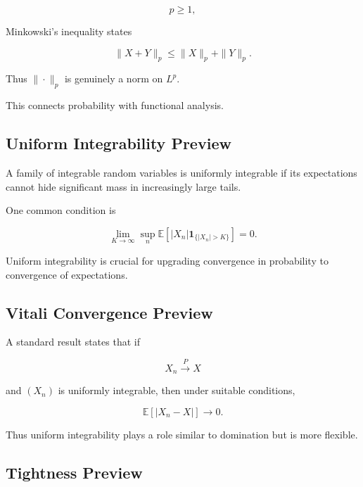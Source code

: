 \[
p\geq1,
\]

Minkowski's inequality states

\[
\boxed{
\|X+Y\|_p
\leq
\|X\|_p+\|Y\|_p.
}
\]

Thus \(\|\cdot\|_p\) is genuinely a norm on \(L^p\).

This connects probability with functional analysis.

\subsection{Uniform Integrability Preview}
\label{subsec:uniform-integrability-preview}

A family of integrable random variables is uniformly integrable if its
expectations cannot hide significant mass in increasingly large tails.

One common condition is

\[
\boxed{
\lim_{K\to\infty}
\sup_n
\mathbb{E}
\left[
|X_n|
\mathbf{1}_{\{|X_n|>K\}}
\right]
=
0.
}
\]

Uniform integrability is crucial for upgrading convergence in
probability to convergence of expectations.

\subsection{Vitali Convergence Preview}
\label{subsec:vitali-convergence-preview}

A standard result states that if

\[
X_n\xrightarrow{P}X
\]

and \((X_n)\) is uniformly integrable, then under suitable conditions,

\[
\boxed{
\mathbb{E}[|X_n-X|]
\to0.
}
\]

Thus uniform integrability plays a role similar to domination but is
more flexible.

\subsection{Tightness Preview}
\label{subsec:tightness-probability-preview}

